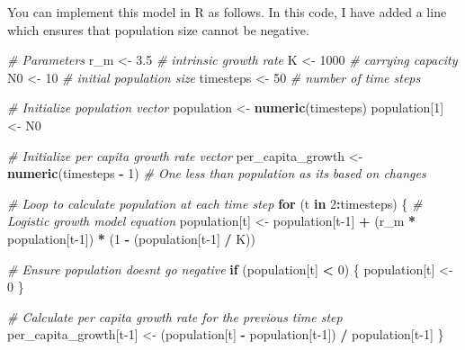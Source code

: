 \documentclass[
  a4paper]{book}
\newenvironment{Shaded}{\begin{snugshade}}{\end{snugshade}}
\newcommand{\CommentTok}[1]{\textcolor[rgb]{0.56,0.35,0.01}{\textit{#1}}}
\newcommand{\ControlFlowTok}[1]{\textcolor[rgb]{0.13,0.29,0.53}{\textbf{#1}}}
\newcommand{\DecValTok}[1]{\textcolor[rgb]{0.00,0.00,0.81}{#1}}
\newcommand{\FloatTok}[1]{\textcolor[rgb]{0.00,0.00,0.81}{#1}}
\newcommand{\FunctionTok}[1]{\textcolor[rgb]{0.13,0.29,0.53}{\textbf{#1}}}
\newcommand{\NormalTok}[1]{#1}
\newcommand{\OtherTok}[1]{\textcolor[rgb]{0.56,0.35,0.01}{#1}}
\newcommand{\SpecialCharTok}[1]{\textcolor[rgb]{0.81,0.36,0.00}{\textbf{#1}}}
\begin{document}
You can implement this model in R as follows.
In this code, I have added a line which ensures that population size cannot be negative.

\begin{Shaded}
\begin{Highlighting}[]
\CommentTok{\# Parameters}
\NormalTok{r\_m }\OtherTok{\textless{}{-}} \FloatTok{3.5}  \CommentTok{\# intrinsic growth rate}
\NormalTok{K }\OtherTok{\textless{}{-}} \DecValTok{1000}   \CommentTok{\# carrying capacity}
\NormalTok{N0 }\OtherTok{\textless{}{-}} \DecValTok{10}    \CommentTok{\# initial population size}
\NormalTok{timesteps }\OtherTok{\textless{}{-}} \DecValTok{50}  \CommentTok{\# number of time steps}

\CommentTok{\# Initialize population vector}
\NormalTok{population }\OtherTok{\textless{}{-}} \FunctionTok{numeric}\NormalTok{(timesteps)}
\NormalTok{population[}\DecValTok{1}\NormalTok{] }\OtherTok{\textless{}{-}}\NormalTok{ N0}

\CommentTok{\# Initialize per capita growth rate vector}
\NormalTok{per\_capita\_growth }\OtherTok{\textless{}{-}} \FunctionTok{numeric}\NormalTok{(timesteps }\SpecialCharTok{{-}} \DecValTok{1}\NormalTok{)  }\CommentTok{\# One less than population as it\textquotesingle{}s based on changes}

\CommentTok{\# Loop to calculate population at each time step}
\ControlFlowTok{for}\NormalTok{ (t }\ControlFlowTok{in} \DecValTok{2}\SpecialCharTok{:}\NormalTok{timesteps) \{}
  \CommentTok{\# Logistic growth model equation}
\NormalTok{  population[t] }\OtherTok{\textless{}{-}}\NormalTok{ population[t}\DecValTok{{-}1}\NormalTok{] }\SpecialCharTok{+}\NormalTok{ (r\_m }\SpecialCharTok{*}\NormalTok{ population[t}\DecValTok{{-}1}\NormalTok{]) }\SpecialCharTok{*}\NormalTok{ (}\DecValTok{1} \SpecialCharTok{{-}}\NormalTok{ (population[t}\DecValTok{{-}1}\NormalTok{] }\SpecialCharTok{/}\NormalTok{ K))}
  
  \CommentTok{\# Ensure population doesn\textquotesingle{}t go negative}
  \ControlFlowTok{if}\NormalTok{ (population[t] }\SpecialCharTok{\textless{}} \DecValTok{0}\NormalTok{) \{}
\NormalTok{    population[t] }\OtherTok{\textless{}{-}} \DecValTok{0}
\NormalTok{  \}}
  
  \CommentTok{\# Calculate per capita growth rate for the previous time step}
\NormalTok{  per\_capita\_growth[t}\DecValTok{{-}1}\NormalTok{] }\OtherTok{\textless{}{-}}\NormalTok{ (population[t] }\SpecialCharTok{{-}}\NormalTok{ population[t}\DecValTok{{-}1}\NormalTok{]) }\SpecialCharTok{/}\NormalTok{ population[t}\DecValTok{{-}1}\NormalTok{]}
\NormalTok{\}}


\end{Highlighting}
\end{Shaded}
\end{document}
